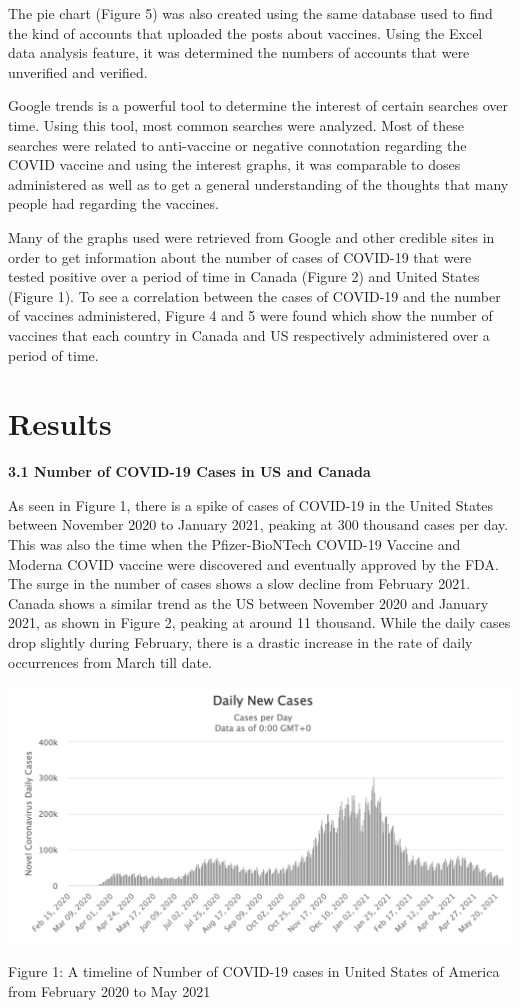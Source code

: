 \documentclass[10pt,twocolumn,letterpaper]{article}
\begin{document}
The pie chart (Figure 5) was also created using the same database used to find the kind of accounts that uploaded the posts about vaccines. Using the Excel data analysis feature, it was determined the numbers of accounts that were unverified and verified.

Google trends is a powerful tool to determine the interest of certain searches over time. Using this tool, most common searches were analyzed. Most of these searches were related to anti-vaccine or negative connotation regarding the COVID vaccine and using the interest graphs, it was comparable to doses administered as well as to get a general understanding of the thoughts that many people had regarding the vaccines.

Many of the graphs used were retrieved from Google and other credible sites in order to get information about the number of cases of COVID-19 that were tested positive over a period of time in Canada (Figure 2) and United States (Figure 1). To see a correlation between the cases of COVID-19 and the number of vaccines administered, Figure 4 and 5 were found which show the number of vaccines that each country in Canada and US respectively administered over a period of time.

\section{Results}

\textbf{3.1 Number of COVID-19 Cases in US and Canada}

As seen in Figure 1, there is a spike of cases of COVID-19 in the United States between November 2020 to January 2021, peaking at 300 thousand cases per day. This was also the time when the Pfizer-BioNTech COVID-19 Vaccine and Moderna COVID vaccine were discovered and eventually approved by the FDA. The surge in the number of cases shows a slow decline from February 2021. Canada shows a similar trend as the US between November 2020 and January 2021, as shown in Figure 2, peaking at around 11 thousand. While the daily cases drop slightly during February, there is a drastic increase in the rate of daily occurrences from March till date. 


\includegraphics[scale=0.30]{fig1.png}
\caption{Figure 1: A timeline of Number of COVID-19 cases in United States of America from February 2020 to May 2021}
\end{document}
